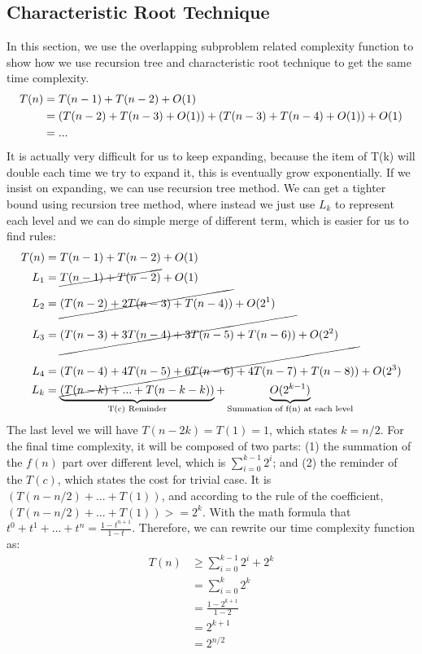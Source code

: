 \documentclass[a4paper,11pt]{book}
\begin{document}
\subsection{Characteristic Root Technique}
In this section, we use the overlapping subproblem related complexity function to show how we use recursion tree and characteristic root technique to get the same time complexity. 
\begin{align}
\label{complexity_eq_fibonacci_1}
    T(n)&=T(n-1)+T(n-2)+O(1)\\
    &=(T(n-2)+T(n-3)+O(1))+(T(n-3)+T(n-4)+O(1))+O(1)\notag\\
    &=...
\end{align}
It is actually very difficult for us to keep expanding, because the item of T(k) will double each time we try to expand it, this is eventually grow exponentially. If we insist on expanding, we can use recursion tree method. We can get a tighter bound using recursion tree method, where instead we just use $L_k$ to represent each level and we can do simple merge of different term, which is easier for us to find rules: 
\begin{align}
\label{complexity_eq_fibonacci_1}
    T(n)&=T(n-1)+T(n-2)         +          O(1)\\
    L_1&=\cancel{T(n-1)+T(n-2)}         +          O(1)\\
    L_2&=\cancel{(T(n-2)+2T(n-3)+T(n-4))}+O(2^1)\notag\\
    L_3&=\cancel{(T(n-3)+3T(n-4)+3T(n-5)+T(n-6))}+O(2^2)\notag\\
    L_4&=\cancel{(T(n-4)+4T(n-5)+6T(n-6)+4T(n-7)+T(n-8))}+O(2^3)\notag\\
    L_k&=\underbrace{(T(n-k)+...+T(n-k-k))}_\text{T(c) Reminder}+\underbrace{O(2^{k-1})}_\text{Summation of f(n) at each level}\notag
\end{align}
The last level we will have $T(n-2k)=T(1)=1$, which states $k=n/2$. For the final time complexity, it will be composed of two parts: (1) the summation of the $f(n)$ part over different level, which is $\sum_{i=0}^{k-1} 2^i$; and (2) the reminder of the $T(c)$, which states the cost for trivial case. It is $(T(n-n/2)+...+T(1))$, and according to the rule of the coefficient, $(T(n-n/2)+...+T(1))>=2^k$. With the math formula that $t^0+t^1+...+t^n=\frac{1-t^{n+1}}{1-t}$. Therefore, we can rewrite our time complexity function as:
\begin{align}
    T(n)&\geq \sum_{i=0}^{k-1} 2^i + 2^k\\
    &=\sum_{i=0}^{k} 2^k \\
    &=\frac{1-2^{k+1}}{1-2} \\
    &=2^{k+1}\\
    &=2^{n/2}
\end{align}
\end{document}
